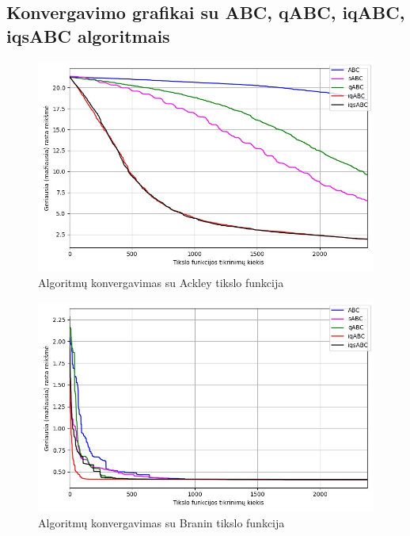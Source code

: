 \documentclass{VUMIFKompMagistrinis}
\begin{document}
\begin{landscape}

\section{Konvergavimo grafikai su ABC, qABC, iqABC, iqsABC algoritmais}\label{PR3all}

\begin{multicols}{2}

\begin{figure}[H]
    \centering
    \includegraphics[scale=0.45]{img/2kv/all_ackley.jpg}
    \caption{Algoritmų konvergavimas su Ackley tikslo funkcija}
    \label{img:kon1}
\end{figure}

\begin{figure}[H]
    \centering
    \includegraphics[scale=0.45]{img/2kv/all_branin.jpg}
     \caption{Algoritmų konvergavimas su Branin tikslo funkcija}
    \label{img:kon2}
\end{figure}


\end{multicols}
\end{landscape}
\end{document}

